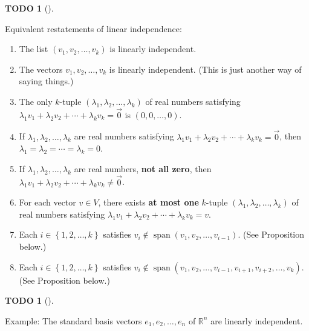 \documentclass[numbers=enddot,12pt,final,onecolumn,notitlepage]{scrartcl}%
\theoremstyle{definition}
\newtheorem{quest}[theo]{TODO}
\newenvironment{todo}[1][]
{\begin{quest}[#1]\begin{leftbar}}
{\end{leftbar}\end{quest}}
\begin{document}
\begin{todo}
Equivalent restatements of linear independence:

\begin{enumerate}
\item The list $\left(  v_{1},v_{2},\ldots,v_{k}\right)  $ is linearly independent.

\item The vectors $v_{1},v_{2},\ldots,v_{k}$ is linearly independent. (This is
just another way of saying things.)

\item The only $k$-tuple $\left(  \lambda_{1},\lambda_{2},\ldots,\lambda
_{k}\right)  $ of real numbers satisfying $\lambda_{1}v_{1}+\lambda_{2}%
v_{2}+\cdots+\lambda_{k}v_{k}=\overrightarrow{0}$ is $\left(  0,0,\ldots
,0\right)  $.

\item If $\lambda_{1},\lambda_{2},\ldots,\lambda_{k}$ are real numbers
satisfying $\lambda_{1}v_{1}+\lambda_{2}v_{2}+\cdots+\lambda_{k}%
v_{k}=\overrightarrow{0}$, then $\lambda_{1}=\lambda_{2}=\cdots=\lambda_{k}=0$.

\item If $\lambda_{1},\lambda_{2},\ldots,\lambda_{k}$ are real numbers,
\textbf{not all zero}, then $\lambda_{1}v_{1}+\lambda_{2}v_{2}+\cdots
+\lambda_{k}v_{k}\neq\overrightarrow{0}$.

\item For each vector $v\in V$, there exists \textbf{at most one} $k$-tuple
$\left(  \lambda_{1},\lambda_{2},\ldots,\lambda_{k}\right)  $ of real numbers
satisfying $\lambda_{1}v_{1}+\lambda_{2}v_{2}+\cdots+\lambda_{k}v_{k}=v$.

\item Each $i\in\left\{  1,2,\ldots,k\right\}  $ satisfies $v_{i}%
\notin\operatorname*{span}\left(  v_{1},v_{2},\ldots,v_{i-1}\right)  $. (See
Proposition below.)

\item Each $i\in\left\{  1,2,\ldots,k\right\}  $ satisfies $v_{i}%
\notin\operatorname*{span}\left(  v_{1},v_{2},\ldots,v_{i-1},v_{i+1}%
,v_{i+2},\ldots,v_{k}\right)  $. (See Proposition below.)
\end{enumerate}
\end{todo}

\begin{todo}
Example: The standard basis vectors $e_{1},e_{2},\ldots,e_{n}$ of
$\mathbb{R}^{n}$ are linearly independent.
\end{todo}
\end{document}
